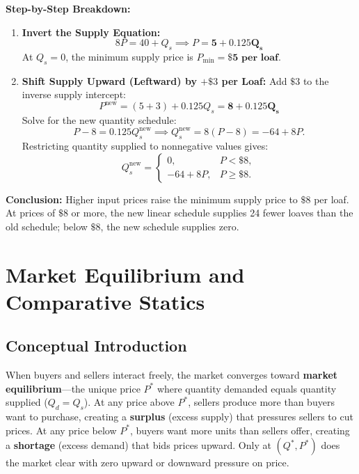\documentclass[11pt,letterpaper]{article}
\begin{document}
\noindent\textbf{Step-by-Step Breakdown:}
\begin{enumerate}
    \item \textbf{Invert the Supply Equation:}
    \[
    8P = 40 + Q_s \implies P = \mathbf{5 + 0.125Q_s}
    \]
    At $Q_s = 0$, the minimum supply price is $P_{\min} = \mathbf{\$5\text{ per loaf}}$.

    \item \textbf{Shift Supply Upward (Leftward) by $+\$3$ per Loaf:}
    Add $\$3$ to the inverse supply intercept:
    \[
    P^{\text{new}} = (5 + 3) + 0.125Q_s = \mathbf{8 + 0.125Q_s}
    \]
    Solve for the new quantity schedule:
    \[
    P-8=0.125Q_s^{\text{new}}
    \implies Q_s^{\text{new}}=8(P-8)=-64+8P.
    \]
    Restricting quantity supplied to nonnegative values gives:
    \[
    Q_s^{\text{new}} =
    \begin{cases}
        0, & P < \$8,\\
        -64 + 8P, & P \ge \$8.
    \end{cases}
    \]
\end{enumerate}
    \textbf{Conclusion:} Higher input prices raise the minimum supply price to $\$8$ per loaf. At prices of $\$8$ or more, the new linear schedule supplies 24 fewer loaves than the old schedule; below $\$8$, the new schedule supplies zero.

\section{Market Equilibrium and Comparative Statics}

\subsection*{Conceptual Introduction}
When buyers and sellers interact freely, the market converges toward \textbf{market equilibrium}—the unique price $P^*$ where quantity demanded equals quantity supplied ($Q_d = Q_s$). At any price above $P^*$, sellers produce more than buyers want to purchase, creating a \textbf{surplus} (excess supply) that pressures sellers to cut prices. At any price below $P^*$, buyers want more units than sellers offer, creating a \textbf{shortage} (excess demand) that bids prices upward. Only at $(Q^*, P^*)$ does the market clear with zero upward or downward pressure on price.
\end{document}
